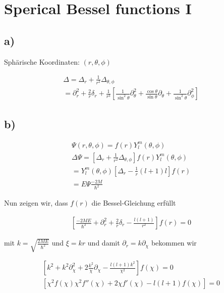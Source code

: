 \section{Sperical Bessel functions I}

\subsection{a)}

Sph\"arische Koordinaten: $\left(r, \theta, \phi\right)$

\begin{align}
\Delta = \Delta_r + \frac{1}{r^2} \Delta_{\theta,\phi} \\
= \partial_r^2 + \frac{2}{r} \delta_r + \frac{1}{r^3} 
\left[\frac{1}{\sin^2{\theta}}\partial_{\theta}^2 +
\frac{\cos{\theta}}{\sin{\theta}} \partial_{\theta} +
\frac{1}{\sin^2{\theta}}\partial_{\phi}^2 \right]
\end{align}

\subsection{b)}

\begin{align}
\Psi \left(r, \theta, \phi\right) = f \left(r\right) Y_l^m \left(\theta,
\phi\right) \\
\Delta \Psi = \left[\Delta_r + \frac{1}{r^2} \Delta_{\theta,\phi}\right] f \left(r\right) Y_l^m \left(\theta,
\phi\right) \\
= Y_l^m \left(\theta,\phi\right) \left[\Delta_r - \frac{1}{r} \left(l+1\right) l
\right] f \left(r\right) \\
= E \Psi \frac{-2M}{\hbar^2}
\end{align}

Nun zeigen wir, dass $f\left(r\right)$ die Bessel-Gleichung erf\"ullt

\begin{align}
\left[ \frac{-2ME}{\hbar^2} + \partial_r^2 + \frac{2}{r} \delta_r -
\frac{l \left(l+1\right)}{r^2} \right] f \left(r\right) = 0
\end{align}

mit $k = \sqrt{\frac{2ME}{\hbar^2}}$ und $\xi = kr$ und damit $\partial_r = k
\partial_{\chi}$ bekommen wir

\begin{align}
\left[k^2 + k^2 \partial_{\chi}^2 + 2 \frac{k^2}{\chi} \partial_{\chi} -
\frac{l \left(l+1\right)k^2}{\chi^2} \right] f \left(\chi\right) = 0 \\
\left[ \chi^2 f\left(\chi\right) \chi^2 f''\left(\chi\right) + 2\chi
f'\left(\chi\right) - l \left(l+1\right)f\left(\chi\right) \right] = 0
\end{align}


